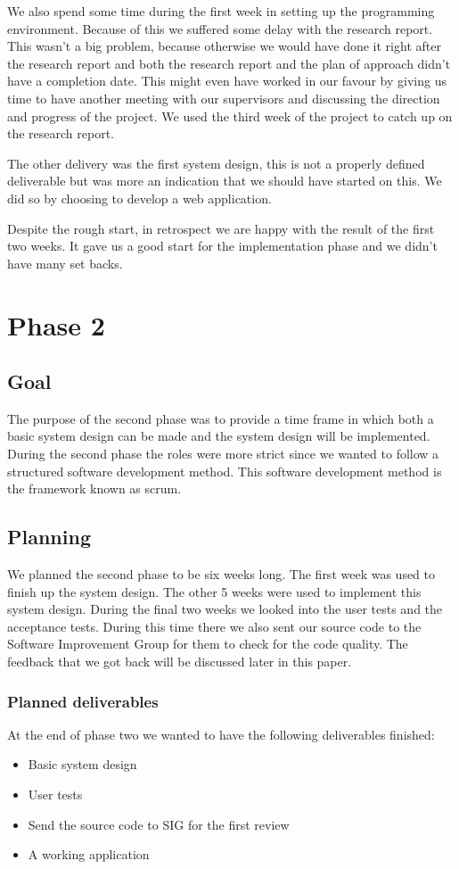 We also spend some time during the first week in setting up the programming environment.
Because of this we suffered some delay with the research report.
This wasn't a big problem, because otherwise we would have done it right after the research report and both the research report and the plan of approach didn't have a completion date.
This might even have worked in our favour by giving us time to have another meeting with our supervisors and discussing the direction and progress of the project.
We used the third week of the project to catch up on the research report.

The other delivery was the first system design, this is not a properly defined deliverable but was more an indication that we should have started on this.
We did so by choosing to develop a web application.

Despite the rough start, in retrospect we are happy with the result of the first two weeks.
It gave us a good start for the implementation phase and we didn't have many set backs.

\section{Phase 2}
\subsection{Goal}
The purpose of the second phase was to provide a time frame in which both a basic system design can be made and the system design will be implemented.
During the second phase the roles were more strict since we wanted to follow a structured software development method.
This software development method is the framework known as scrum.

\subsection{Planning}
We planned the second phase to be six weeks long.
The first week was used to finish up the system design.
The other 5 weeks were used to implement this system design.
During the final two weeks we looked into the user tests and the acceptance tests.
During this time there we also sent our source code to the Software Improvement Group for them to check for the code quality.
The feedback that we got back will be discussed later in this paper.

\subsubsection{Planned deliverables}
At the end of phase two we wanted to have the following deliverables finished:
\begin{itemize}
\item Basic system design
\item User tests
\item Send the source code to SIG for the first review
\item A working application
\end{itemize}

